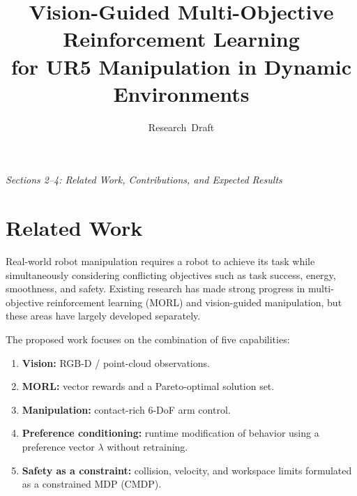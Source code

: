 \documentclass[journal]{IEEEtran}
\begin{document}

\title{Vision-Guided Multi-Objective Reinforcement Learning\\
for UR5 Manipulation in Dynamic Environments}

\author{Research~Draft}

\maketitle

\begin{center}
\small
\textit{Sections 2--4: Related Work, Contributions, and Expected Results}
\end{center}

\vspace{0.5em}


\section{Related Work}

Real-world robot manipulation requires a robot to achieve its task
while simultaneously considering conflicting objectives such as task
success, energy, smoothness, and safety. Existing research has made
strong progress in multi-objective reinforcement learning (MORL) and
vision-guided manipulation, but these areas have largely developed
separately.

The proposed work focuses on the combination of five capabilities:

\begin{enumerate}
    \item \textbf{Vision:} RGB-D / point-cloud observations.
    \item \textbf{MORL:} vector rewards and a Pareto-optimal solution set.
    \item \textbf{Manipulation:} contact-rich 6-DoF arm control.
    \item \textbf{Preference conditioning:} runtime modification of
    behavior using a preference vector $\lambda$ without retraining.
    \item \textbf{Safety as a constraint:} collision, velocity, and
    workspace limits formulated as a constrained MDP (CMDP).
\end{enumerate}
\end{document}
